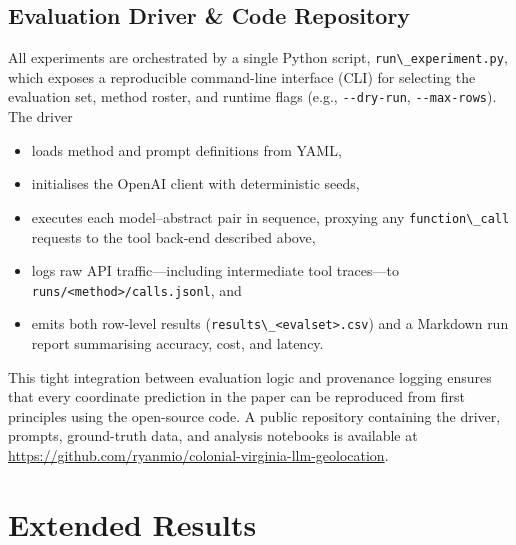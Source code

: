\subsection{Evaluation Driver \& Code
Repository}\label{a.5-evaluation-driver-code-repository}

All experiments are orchestrated by a single Python script,
\passthrough{\lstinline!run\_experiment.py!}, which exposes a
reproducible command-line interface (CLI) for selecting the evaluation
set, method roster, and runtime flags (e.g.,
\passthrough{\lstinline!--dry-run!},
\passthrough{\lstinline!--max-rows!}). The driver

\begin{itemize}
\tightlist
\item
  loads method and prompt definitions from YAML,
\item
  initialises the OpenAI client with deterministic seeds,
\item
  executes each model--abstract pair in sequence, proxying any
  \passthrough{\lstinline!function\_call!} requests to the tool back-end
  described above,
\item
  logs raw API traffic---including intermediate tool traces---to
  \passthrough{\lstinline!runs/<method>/calls.jsonl!}, and
\item
  emits both row-level results
  (\passthrough{\lstinline!results\_<evalset>.csv!}) and a Markdown run
  report summarising accuracy, cost, and latency.
\end{itemize}

This tight integration between evaluation logic and provenance logging
ensures that every coordinate prediction in the paper can be reproduced
from first principles using the open-source code. A public repository
containing the driver, prompts, ground-truth data, and analysis
notebooks is available at
\url{https://github.com/ryanmio/colonial-virginia-llm-geolocation}.

\section{Extended
Results}\label{appendix-b-extended-results}

\DIFdelbegin \subsection{}%
\addtocounter{subsection}{-1}%

